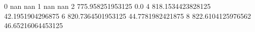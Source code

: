 0 nan nan
1 nan nan
2 775.958251953125 0.0
4 818.1534423828125 42.1951904296875
6 820.7364501953125 44.7781982421875
8 822.6104125976562 46.65216064453125
